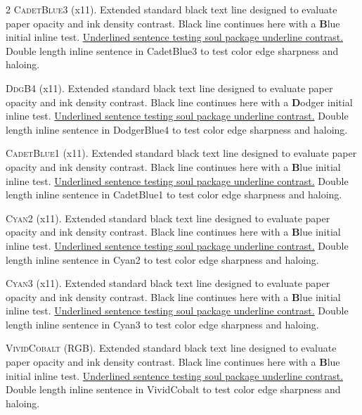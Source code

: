 \begin{multicols}{2}
\lettrine[lines=2]{\textcolor{CadetBlue3}{C}}{adetBlue3} (x11). Extended standard black text line designed to evaluate paper opacity and ink density contrast. Black line continues here with a \textbf{\textcolor{CadetBlue3}{B}}lue initial inline test. \ul{Underlined sentence testing soul package underline contrast.} \textcolor{CadetBlue3}{Double length inline sentence in CadetBlue3 to test color edge sharpness and haloing.}


\lettrine[lines=2]{\textcolor{DodgerBlue4}{D}}{dgB4} (x11). Extended standard black text line designed to evaluate paper opacity and ink density contrast. Black line continues here with a \textbf{\textcolor{DodgerBlue4}{D}}odger initial inline test. \ul{Underlined sentence testing soul package underline contrast.} \textcolor{DodgerBlue4}{Double length inline sentence in DodgerBlue4 to test color edge sharpness and haloing.}


\lettrine[lines=2]{\textcolor{CadetBlue1}{C}}{adetBlue1} (x11). Extended standard black text line designed to evaluate paper opacity and ink density contrast. Black line continues here with a \textbf{\textcolor{CadetBlue1}{B}}lue initial inline test. \ul{Underlined sentence testing soul package underline contrast.} \textcolor{CadetBlue1}{Double length inline sentence in CadetBlue1 to test color edge sharpness and haloing.}


\lettrine[lines=2]{\textcolor{Cyan2}{C}}{yan2} (x11). Extended standard black text line designed to evaluate paper opacity and ink density contrast. Black line continues here with a \textbf{\textcolor{Cyan2}{B}}lue initial inline test. \ul{Underlined sentence testing soul package underline contrast.} \textcolor{Cyan2}{Double length inline sentence in Cyan2 to test color edge sharpness and haloing.}


\lettrine[lines=2]{\textcolor{Cyan3}{C}}{yan3} (x11). Extended standard black text line designed to evaluate paper opacity and ink density contrast. Black line continues here with a \textbf{\textcolor{Cyan3}{B}}lue initial inline test. \ul{Underlined sentence testing soul package underline contrast.} \textcolor{Cyan3}{Double length inline sentence in Cyan3 to test color edge sharpness and haloing.}


\lettrine[lines=2]{\textcolor{VividCobalt}{V}}{ividCobalt} (RGB). Extended standard black text line designed to evaluate paper opacity and ink density contrast. Black line continues here with a \textbf{\textcolor{VividCobalt}{B}}lue initial inline test. \ul{Underlined sentence testing soul package underline contrast.} \textcolor{VividCobalt}{Double length inline sentence in VividCobalt to test color edge sharpness and haloing.}



\end{multicols}
